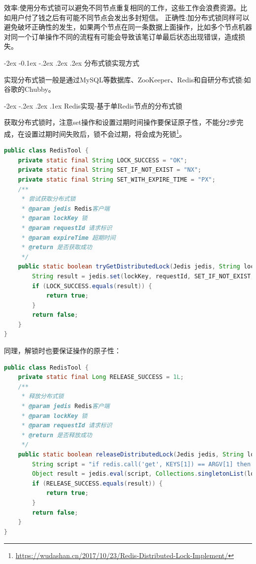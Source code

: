\documentclass[8pt]{book}
\makeatletter
\numberwithin{dummy}{section}
\theoremstyle{ocrenumbox}
\theoremstyle{blacknumex}
\theoremstyle{blacknumbox}
\theoremstyle{ocrenum}
\renewcommand{\subsubsection}{\@startsection {subsubsection}{3}{\z@}
	{-2ex \@plus -0.1ex \@minus -.2ex}
	{.2ex \@plus.2ex }
	{\normalfont\small\sffamily\bfseries}}
\renewcommand\paragraph{\@startsection{paragraph}{4}{\z@}
	{-2ex \@plus-.2ex \@minus .2ex}
	{.1ex}
	{\normalfont\small\sffamily\bfseries}}
\makeatother
\begin{document}
效率:使用分布式锁可以避免不同节点重复相同的工作，这些工作会浪费资源。比如用户付了钱之后有可能不同节点会发出多封短信。
正确性:加分布式锁同样可以避免破坏正确性的发生，如果两个节点在同一条数据上面操作，比如多个节点机器对同一个订单操作不同的流程有可能会导致该笔订单最后状态出现错误，造成损失。

\subsubsection{分布式锁实现方式}

实现分布式锁一般是通过MySQL等数据库、ZooKeeper、Redis和自研分布式锁:如谷歌的Chubby。

\paragraph{Redis实现-基于单Redis节点的分布式锁}

获取分布式锁时，注意set操作和设置过期时间操作要保证原子性，不能分2步完成，在设置过期时间失败后，锁不会过期，将会成为死锁\footnote{\url{https://wudashan.cn/2017/10/23/Redis-Distributed-Lock-Implement/}}。

\begin{lstlisting}[language=Java]
public class RedisTool {
    private static final String LOCK_SUCCESS = "OK";
    private static final String SET_IF_NOT_EXIST = "NX";
    private static final String SET_WITH_EXPIRE_TIME = "PX";
    /**
     * 尝试获取分布式锁
     * @param jedis Redis客户端
     * @param lockKey 锁
     * @param requestId 请求标识
     * @param expireTime 超期时间
     * @return 是否获取成功
     */
    public static boolean tryGetDistributedLock(Jedis jedis, String lockKey, String requestId, int expireTime) {
        String result = jedis.set(lockKey, requestId, SET_IF_NOT_EXIST, SET_WITH_EXPIRE_TIME, expireTime);
        if (LOCK_SUCCESS.equals(result)) {
            return true;
        }
        return false;
    }
}
\end{lstlisting}

同理，解锁时也要保证操作的原子性：

\begin{lstlisting}[language=Java]
public class RedisTool {
    private static final Long RELEASE_SUCCESS = 1L;
    /**
     * 释放分布式锁
     * @param jedis Redis客户端
     * @param lockKey 锁
     * @param requestId 请求标识
     * @return 是否释放成功
     */
    public static boolean releaseDistributedLock(Jedis jedis, String lockKey, String requestId) {
        String script = "if redis.call('get', KEYS[1]) == ARGV[1] then return redis.call('del', KEYS[1]) else return 0 end";
        Object result = jedis.eval(script, Collections.singletonList(lockKey), Collections.singletonList(requestId));
        if (RELEASE_SUCCESS.equals(result)) {
            return true;
        }
        return false;
    }
}
\end{lstlisting}
\end{document}
